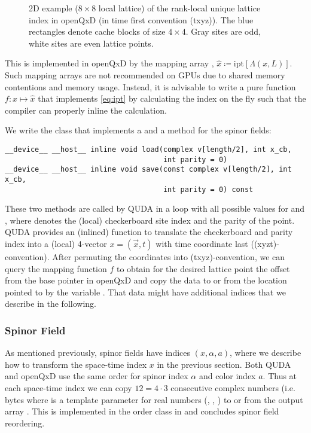 \begin{figure}
  \caption{2D example ($8 \times 8$ local lattice) of the rank-local unique lattice index in openQxD (in time first convention (txyz)). The blue rectangles denote cache blocks of size $4 \times 4$. Gray sites are odd, white sites are even lattice points.}
  \label{fig:index}
\end{figure}

This is implemented in openQxD by the mapping array , $\hat{x} \coloneqq \text{ipt}\left[\Lambda(x,L)\right]$. Such mapping arrays are not recommended on GPUs due to shared memory contentions and memory usage. Instead, it is advisable to write a pure function $f \colon x \mapsto \hat{x}$ that implements \cref{eq:ipt} by calculating the index on the fly such that the compiler can properly inline the calculation.

We write the  class that implements a  and a  method for the spinor fields:

\begin{verbatim}
__device__ __host__ inline void load(complex v[length/2], int x_cb,
                                     int parity = 0)
__device__ __host__ inline void save(const complex v[length/2], int x_cb,
                                     int parity = 0) const
\end{verbatim}

These two methods are called by QUDA in a loop with all possible values for  and , where  denotes the (local) checkerboard site index and  the parity of the point. QUDA provides an (inlined) function  to translate the checkerboard and parity index into a (local) 4-vector $x = (\vec{x}, t)$ with time coordinate last ((xyzt)-convention). After permuting the coordinates into (txyz)-convention, we can query the mapping function $f$ to obtain for the desired lattice point the offset from the base pointer in openQxD and copy the data to or from the location pointed to by the variable . That data might have additional indices that we describe in the
following.

\subsubsection{Spinor Field}

As mentioned previously, spinor fields have indices $(x,\alpha,a)$, where we describe how to transform the space-time index $x$ in the previous section. Both QUDA and openQxD use the same order for spinor index $\alpha$ and color index $a$. Thus at each space-time index we can copy $12=4 \cdot 3$ consecutive complex numbers (i.e.  bytes where  is a template parameter for real numbers (, , ) to or from the output array . This is implemented in the order class  in  \cite{QUDApaper} and concludes spinor field reordering.

